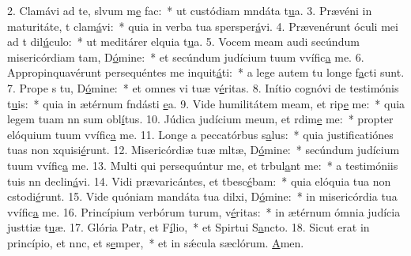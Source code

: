 2. Clamávi ad te, slvum m\uline{e} fac:~* ut custódiam mndáta t\uline{u}a.
3. Prævéni in maturitáte, t clam\uline{á}vi:~* quia in verba tua spersper\uline{á}vi.
4. Prævenérunt óculi mei ad t dil\uline{ú}culo:~* ut meditárer elquia t\uline{u}a.
5. Vocem meam audi secúndum misericórdiam tam, D\uline{ó}mine:~* et secúndum judícium tuum vvífic\uline{a} me.
6. Appropinquavérunt persequéntes me inquit\uline{á}ti:~* a lege autem tu longe f\uline{a}cti sunt.
7. Prope s tu, D\uline{ó}mine:~* et omnes vi tuæ v\uline{é}ritas.
8. Inítio cognóvi de testimónis t\uline{u}is:~* quia in ætérnum fndásti \uline{e}a.
9. Vide humilitátem meam, et rip\uline{e} me:~* quia legem tuam nn sum obl\uline{í}tus.
10. Júdica judícium meum, et rdim\uline{e} me:~* propter elóquium tuum vvífic\uline{a} me.
11. Longe a peccatórbus s\uline{a}lus:~* quia justificatiónes tuas non xquisi\uline{é}runt.
12. Misericórdiæ tuæ mltæ, D\uline{ó}mine:~* secúndum judícium tuum vvífic\uline{a} me.
13. Multi qui persequúntur me, et trbul\uline{a}nt me:~* a testimóniis tuis nn declin\uline{á}vi.
14. Vidi prævaricántes, et tbesc\uline{é}bam:~* quia elóquia tua non cstodi\uline{é}runt.
15. Vide quóniam mandáta tua dilxi, D\uline{ó}mine:~* in misericórdia tua vvífic\uline{a} me.
16. Princípium verbórum turum, v\uline{é}ritas:~* in ætérnum ómnia judícia justtiæ t\uline{u}æ.
17. Glória Patr, et F\uline{í}lio,~* et Spirtui S\uline{a}ncto.
18. Sicut erat in princípio, et nnc, et s\uline{e}mper,~* et in sǽcula sæclórum. \uline{A}men.

